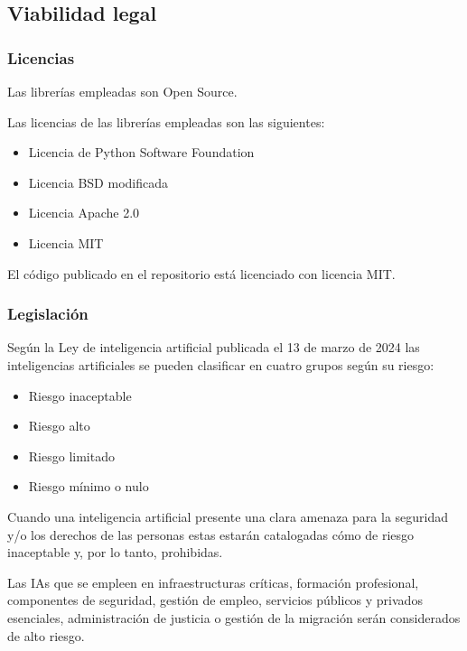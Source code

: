 \subsection{Viabilidad legal}
\subsubsection{Licencias}
Las librerías empleadas son Open Source.

Las licencias de las librerías empleadas son las siguientes:

\begin{itemize}

    \item Licencia de Python Software Foundation
    \item Licencia BSD modificada
    \item Licencia Apache 2.0
    \item Licencia MIT

\end{itemize}

El código publicado en el repositorio está licenciado con licencia MIT.

\subsubsection{Legislación}

Según la Ley de inteligencia artificial publicada el 13 de marzo de 2024 las inteligencias artificiales se pueden clasificar en cuatro grupos según su riesgo:

\begin{itemize}

    \item Riesgo inaceptable
    \item Riesgo alto
    \item Riesgo limitado
    \item Riesgo mínimo o nulo

\end{itemize}

Cuando una inteligencia artificial presente una clara amenaza para la seguridad y/o los derechos de las personas estas estarán catalogadas cómo de riesgo inaceptable y, por lo tanto, prohibidas.

Las IAs que se empleen en infraestructuras críticas, formación profesional, componentes de seguridad, gestión de empleo, servicios públicos y privados esenciales, administración de justicia o gestión de la migración serán considerados de alto riesgo.

